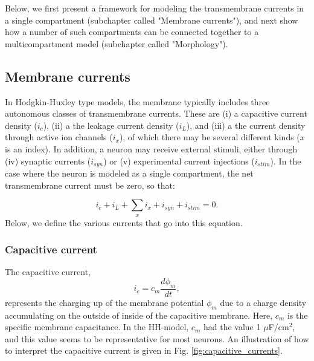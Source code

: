 Below, we first present a framework for modeling the transmembrane currents in a single compartment (subchapter called "Membrane currents"), and next show how a number of such compartments can be connected together to a multicompartment model (subchapter called "Morphology").


\subsection{Membrane currents}
In Hodgkin-Huxley type models, the membrane typically includes three autonomous classes of transmembrane currents. These are (i) a capacitive current density ($i_c$), (ii) a the leakage current density ($i_L$), and (iii) a the current density through active ion channels ($i_x$), of which there may be several different kinds ($x$ is an index). In addition, a neuron may receive external stimuli, either through (iv) synaptic currents ($i_{syn}$) or (v) experimental current injections ($i_{stim}$). In the case where the neuron is modeled as a single compartment, the net transmembrane current must be zero, so that:

\begin{equation}
i_c + i_L + \sum_x{i_x} + i_{syn} + i_{stim} = 0.
\label{eq:singlecomp_zerosum}
\end{equation}
Below, we define the various currents that go into this equation.

\subsubsection{Capacitive current}
The capacitive current, 
\begin{equation}
i_c = c_m \frac{d\phi_m}{dt},
\label{eq:HHcap}
\end{equation}
represents the charging up of the membrane potential $\phi_m$ due to a charge density accumulating on the outside of inside of the capacitive membrane. Here, $c_m$ is the specific membrane capacitance. In the HH-model, $c_m$ had the value
1 $\mu$F/cm$^2$, and this value seems to be representative for most neurons.  An illustration of how to interpret the capacitive current is given in Fig. \ref{fig:capacitive_currents}. 

